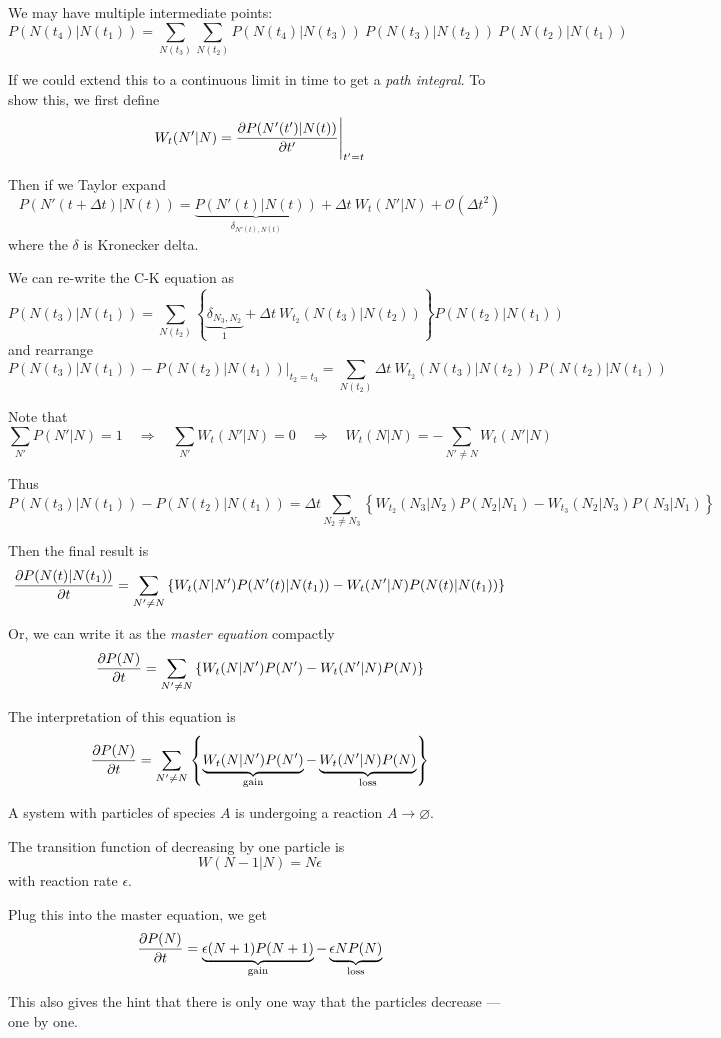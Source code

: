 \documentclass[a4paper,11pt]{article}
\begin{document}
	We may have multiple intermediate points:
	\begin{equation}
		P(N(t_4)| N(t_1)) = \sum_{N(t_3)} \sum_{N(t_2)} P(N(t_4)|N(t_3))\ P(N(t_3)|N(t_2))\ P(N(t_2)|N(t_1))
	\end{equation}

	If we could extend this to a continuous limit in time to get a \emph{path integral}. To show this, we first define
	\[
		W_t (N'|N) = \pdv{P(N'(t')|N(t))}{t'}\Bigg|_{t' = t}
	\]

	Then if we Taylor expand
	\[
		P(N'(t + \Delta t)|N(t)) = \underbrace{P(N'(t)|N(t))}_{\delta_{N'(t),N(t)}} + \Delta t\ W_t(N'|N) + \mathcal{O}(\Delta t^2)
	\]
	where the $\delta$ is Kronecker delta.

	We can re-write the C-K equation as 
	\[
		P(N(t_3)| N(t_1)) = \sum_{N(t_2)} \left\{\underbrace{\delta_{N_3,N_2}}_{1} + \Delta t\ W_{t_2}(N(t_3)|N(t_2)) \right\} P(N(t_2)|N(t_1))
	\]
	and rearrange
	\[
		P(N(t_3)|N(t_1)) - P(N(t_2)|N(t_1))\big|_{t_2 = t_3} = \sum_{N(t_2)} \Delta t\ W_{t_2}(N(t_3)|N(t_2))  P(N(t_2)|N(t_1))
	\]
	
	Note that
	\[
		\sum_{N'} P(N'|N) = 1 \quad \Rightarrow\quad \sum_{N'} W_t (N' | N) = 0 \quad \Rightarrow\quad W_t(N|N) = - \sum_{N' \neq N} W_t (N' | N)
	\]
	
	Thus
	\[
		P(N(t_3)|N(t_1)) - P(N(t_2)|N(t_1)) = \Delta t \sum_{N_2 \neq N_3} \left\{ W_{t_2}(N_3|N_2) P (N_2 | N_1) - W_{t_3}(N_2 | N_3)P(N_3|N_1)\right\}
	\]

	Then the final result is
	\begin{equation}
		\pdv{P(N(t) | N(t_1))}{t} = \sum_{N' \neq N} \left\{ W_t(N | N')P(N'(t) | N(t_1)) - W_t (N' | N)P(N(t) | N(t_1))\right\}
	\end{equation}

	Or, we can write it as the \emph{master equation} compactly
	\begin{equation}
		\pdv{P(N)}{t} = \sum_{N' \neq N} \left\{ W_t (N | N')P(N') - W_t(N'|N)P(N)\right\}
	\end{equation}

	The interpretation of this equation is
	\[
		\pdv{P(N)}{t} = \sum_{N' \neq N} \left\{ \underbrace{W_t (N | N')P(N')}_{\text{gain}} - \underbrace{W_t(N'|N)P(N)}_{\text{loss}}\right\}
	\]

	\begin{ex}[Extinction]
		A system with particles of species $A$ is undergoing a reaction $A \to \varnothing$.

		The transition function of decreasing by one particle is \[
			W(N-1|N) = N \epsilon
		\]
		with reaction rate $\epsilon$.

		Plug this into the master equation, we get
		\[
			\pdv{P(N)}{t} = \underbrace{\epsilon (N+1) P(N+1)}_{\text{gain}} - \underbrace{\epsilon N P(N)}_{\text{loss}}
		\]
		
		This also gives the hint that there is only one way that the particles decrease --- one by one.
	\end{ex}
	
	
	
\end{document}
